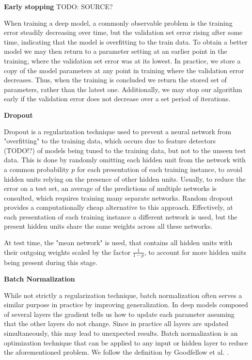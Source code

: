 \textbf{Early stopping}
TODO: SOURCE?

When training a deep model, a commonly observable problem is the training error steadily decreasing over time, but the validation set error rising after some time, indicating that the model is overfitting to the train data. To obtain a better model we may then return to a parameter setting at an earlier point in the training, where the validation set error was at its lowest. In practice, we store a copy of the model parameters at any point in training where the validation error decreases. Thus, when the training is concluded we return the stored set of parameters, rather than the latest one. Additionally, we may stop our algorithm early if the validation error does not decrease over a set period of iterations.

\textbf{Dropout}

Dropout \cite{hinton2012improving} is a regularization technique used to prevent a neural network from "overfitting" to the training data, which occurs due to feature detectors (TODO!?) of models being tuned to the training data, but not to the unseen test data. This is done by randomly omitting each hidden unit from the network with a common probability $p$ for each presentation of each training instance, to avoid hidden units relying on the presence of other hidden units. Usually, to reduce the error on a test set, an average of the predictions of multiple networks is consulted, which requires training many separate networks. Random dropout provides a computationally cheap alternative to this approach. Effectively, at each presentation of each training instance a different network is used, but the present hidden units share the same weights across all these networks.

At test time, the "mean network" is used, that contains all hidden units with their outgoing weights scaled by the factor $\frac{1}{1-p}$, to account for more hidden units being present during this stage.

\textbf{Batch Normalization}

While not strictly a regularization technique, batch normalization \cite{ioffe2015batch} often serves a similar purpose in practice by improving generalization.
In deep models composed of several layers the gradient tells us how to update each parameter assuming that the other layers do not change. Since in practice all layers are updated simultaneously, this may lead to unexpected results. Batch normalization is an optimization technique that can be applied to any input or hidden layer to reduce the aforementioned problem. We follow the definition by Goodfellow et al. \cite{Goodfellow-et-al-2016}.

